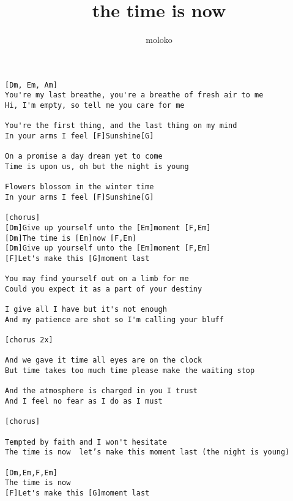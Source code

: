 \author{moloko}
\title{the time is now}
\maketitle
\begin{verbatim}
[Dm, Em, Am]
You're my last breathe, you're a breathe of fresh air to me
Hi, I'm empty, so tell me you care for me

You're the first thing, and the last thing on my mind 
In your arms I feel [F]Sunshine[G]

On a promise a day dream yet to come 
Time is upon us, oh but the night is young 

Flowers blossom in the winter time 
In your arms I feel [F]Sunshine[G]

[chorus]
[Dm]Give up yourself unto the [Em]moment [F,Em]
[Dm]The time is [Em]now [F,Em]
[Dm]Give up yourself unto the [Em]moment [F,Em]
[F]Let's make this [G]moment last 

You may find yourself out on a limb for me
Could you expect it as a part of your destiny 

I give all I have but it's not enough
And my patience are shot so I'm calling your bluff 

[chorus 2x]

And we gave it time all eyes are on the clock
But time takes too much time please make the waiting stop 

And the atmosphere is charged in you I trust
And I feel no fear as I do as I must

[chorus]

Tempted by faith and I won't hesitate 
The time is now  let’s make this moment last (the night is young)

[Dm,Em,F,Em]
The time is now 
[F]Let's make this [G]moment last
\end{verbatim}